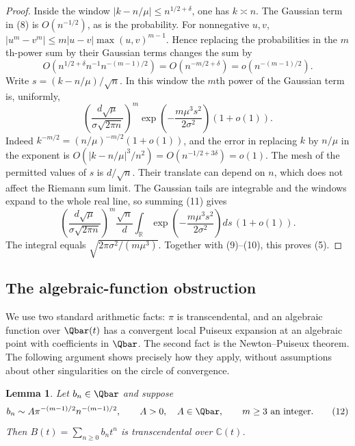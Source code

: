 \documentclass[11pt,a4paper]{article}
\numberwithin{equation}{section}
\newtheorem{lemma}[theorem]{Lemma}
\theoremstyle{definition}
\theoremstyle{remark}
\begin{document}
\begin{proof}
Inside the window $|k-n/\mu|\le n^{1/2+\delta}$, one has $k\asymp n$.
The Gaussian term in (8) is $O(n^{-1/2})$, as is the probability.
For nonnegative $u,v$,
$|u^m-v^m|\le m|u-v|\max(u,v)^{m-1}$.
Hence replacing the probabilities in the $m$th-power sum by their
Gaussian terms changes the sum by
\[
 O\!\left(n^{1/2+\delta}n^{-1}n^{-(m-1)/2}\right)
   =O(n^{-m/2+\delta})
   =o(n^{-(m-1)/2}).                               \tag{10}
\]
Write $s=(k-n/\mu)/\sqrt n$.  In this window the $m$th power of the
Gaussian term is, uniformly,
\[
 \left(\frac{d\sqrt\mu}{\sigma\sqrt{2\pi n}}\right)^m
 \exp\!\left(-\frac{m\mu^3s^2}{2\sigma^2}\right)(1+o(1)).
                                                        \tag{11}
\]
Indeed $k^{-m/2}=(n/\mu)^{-m/2}(1+o(1))$, and the error in replacing
$k$ by $n/\mu$ in the exponent is
$O(|k-n/\mu|^3/n^2)=O(n^{-1/2+3\delta})=o(1)$.
The mesh of the permitted values of $s$ is $d/\sqrt n$.
Their translate can depend on $n$, which does not affect the Riemann
sum limit.  The Gaussian tails are integrable and the windows expand to
the whole real line, so summing (11) gives
\[
 \left(\frac{d\sqrt\mu}{\sigma\sqrt{2\pi n}}\right)^m
 \frac{\sqrt n}{d}
 \int_{\mathbb R}\exp\!\left(-\frac{m\mu^3s^2}{2\sigma^2}\right)ds
 \,(1+o(1)).
\]
The integral equals $\sqrt{2\pi\sigma^2/(m\mu^3)}$.
Together with (9)--(10), this proves (5).
\end{proof}

\subsection{The algebraic-function obstruction}

We use two standard arithmetic facts: $\pi$ is transcendental, and an
algebraic function over $\Qbar(t)$ has a convergent local Puiseux
expansion at an algebraic point with coefficients in $\Qbar$.  The
second fact is the Newton--Puiseux theorem.  The following argument
shows precisely how they apply, without assumptions about other
singularities on the circle of convergence.

\begin{lemma}\label{add43taisho:r43:obstruction}
Let $b_n\in\Qbar$ and suppose
\[
 b_n\sim A\pi^{-(m-1)/2}n^{-(m-1)/2},
 \qquad A>0,\quad A\in\Qbar,
 \qquad m\ge3\text{ an integer}.
                                                        \tag{12}
\]
Then $B(t)=\sum_{n\ge0}b_nt^n$ is transcendental over $\mathbb C(t)$.
\end{lemma}
\end{document}
